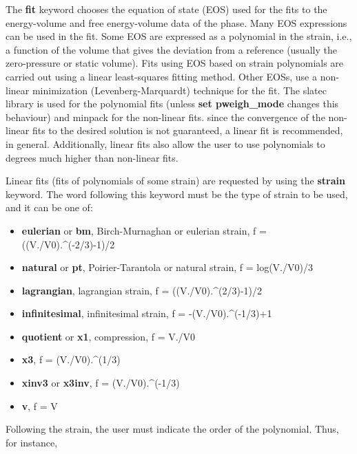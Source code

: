 \documentclass[a4paper]{article}
\begin{document}
\begin{itemize}
The \textbf{fit} keyword chooses the equation of state (EOS) used for
the fits to the energy-volume and free energy-volume data of the
phase. Many EOS expressions can be used in the fit. Some EOS are
expressed as a polynomial in the strain, i.e., a function of the
volume that gives the deviation from a reference (usually the
zero-pressure or static volume). Fits using EOS based on strain
polynomials are carried out using a linear least-squares fitting
method. Other EOSs, use a non-linear minimization
(Levenberg-Marquardt) technique for the fit. The slatec library is
used for the polynomial fits (unless \textbf{set pweigh\_mode} changes
this behaviour) and minpack for the non-linear fits. since the
convergence of the non-linear fits to the desired solution is not
guaranteed, a linear fit is recommended, in general. Additionally,
linear fits also allow the user to use polynomials to degrees much
higher than non-linear fits.

Linear fits (fits of polynomials of some strain) are requested by
using the \textbf{strain} keyword. The word following this keyword must
be the type of strain to be used, and it can be one of:

\begin{itemize}
\item \textbf{eulerian} or \textbf{bm}, Birch-Murnaghan or eulerian strain,
f = ((V./V0).\textasciicircum{}(-2/3)-1)/2

\item \textbf{natural} or \textbf{pt}, Poirier-Tarantola or natural strain,
f = log(V./V0)/3

\item \textbf{lagrangian}, lagrangian strain, f = ((V./V0).\textasciicircum{}(2/3)-1)/2

\item \textbf{infinitesimal}, infinitesimal strain, f = -(V./V0).\textasciicircum{}(-1/3)+1

\item \textbf{quotient} or \textbf{x1}, compression, f = V./V0

\item \textbf{x3}, f = (V./V0).\textasciicircum{}(1/3)

\item \textbf{xinv3} or \textbf{x3inv}, f = (V./V0).\textasciicircum{}(-1/3)

\item \textbf{v}, f = V
\end{itemize}

Following the strain, the user must indicate the order of the
polynomial. Thus, for instance,


\end{itemize}
\end{document}

